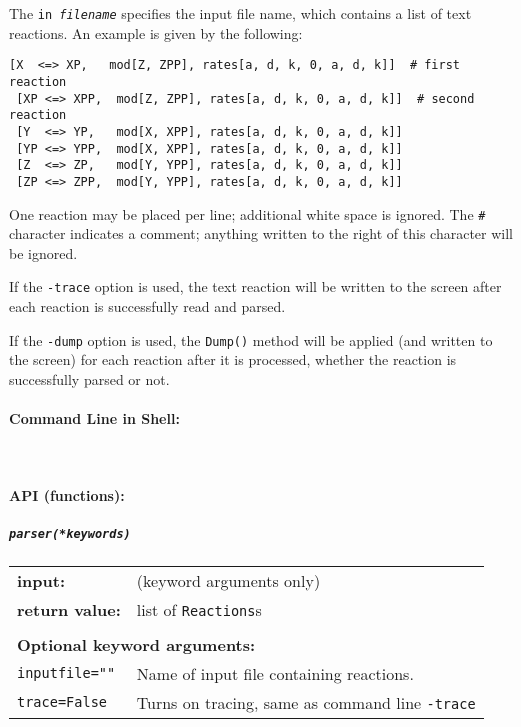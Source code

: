 The {\tt in \textit{filename}} specifies the input file name, which contains a list of text reactions. An example is given by the following:
\begin{Verbatim}[frame=single]
 [X  <=> XP,   mod[Z, ZPP], rates[a, d, k, 0, a, d, k]]  # first reaction
 [XP <=> XPP,  mod[Z, ZPP], rates[a, d, k, 0, a, d, k]]  # second reaction
 [Y  <=> YP,   mod[X, XPP], rates[a, d, k, 0, a, d, k]] 
 [YP <=> YPP,  mod[X, XPP], rates[a, d, k, 0, a, d, k]] 
 [Z  <=> ZP,   mod[Y, YPP], rates[a, d, k, 0, a, d, k]]
 [ZP <=> ZPP,  mod[Y, YPP], rates[a, d, k, 0, a, d, k]]
\end{Verbatim}
One reaction may be placed per line; additional white space is ignored. The {\tt \#} character indicates a comment; 
anything written to the right of this character will be ignored. 

If the {\tt -trace} option is used, the text reaction will be written to the screen after each reaction is successfully read and parsed.

If the {\tt -dump} option is used, the {\tt Dump()} method will be applied (and written to the screen) for each reaction after it is processed, whether the reaction is successfully parsed or not. 

\paragraph{Command Line in Shell:}\ \\



\paragraph{API (functions):}

\subparagraph{\tt parser(*keywords)\\}

\begin{tabular}{ll}
\textbf{input:} & (keyword arguments only) \\
\textbf{return value:}& list of {\tt Reactions}s  \\  \\
\multicolumn{2}{l}{\textbf{Optional keyword arguments:}}\\
{\tt inputfile=""} & Name of input file containing reactions.\\
{\tt trace=False} & Turns on tracing, same as command line {\tt -trace}
\end{tabular}

